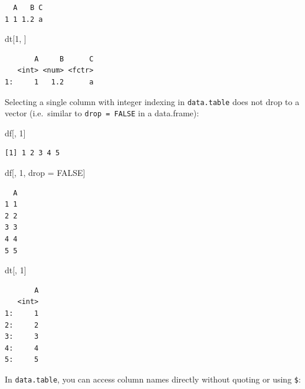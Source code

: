 \documentclass[
]{book}
\newenvironment{Shaded}{\begin{snugshade}}{\end{snugshade}}
\newcommand{\ConstantTok}[1]{\textcolor[rgb]{0.00,0.00,0.00}{#1}}
\newcommand{\DecValTok}[1]{\textcolor[rgb]{0.00,0.00,0.81}{#1}}
\newcommand{\NormalTok}[1]{#1}
\newcommand{\OtherTok}[1]{\textcolor[rgb]{0.56,0.35,0.01}{#1}}
\begin{document}
\begin{verbatim}
  A   B C
1 1 1.2 a
\end{verbatim}

\begin{Shaded}
\begin{Highlighting}[]
\NormalTok{dt[}\DecValTok{1}\NormalTok{, ]}
\end{Highlighting}
\end{Shaded}

\begin{verbatim}
       A     B      C
   <int> <num> <fctr>
1:     1   1.2      a
\end{verbatim}

Selecting a single column with integer indexing in \texttt{data.table} does not drop to a vector (i.e.~similar to \texttt{drop\ =\ FALSE} in a data.frame):

\begin{Shaded}
\begin{Highlighting}[]
\NormalTok{df[, }\DecValTok{1}\NormalTok{]}
\end{Highlighting}
\end{Shaded}

\begin{verbatim}
[1] 1 2 3 4 5
\end{verbatim}

\begin{Shaded}
\begin{Highlighting}[]
\NormalTok{df[, }\DecValTok{1}\NormalTok{, drop }\OtherTok{=} \ConstantTok{FALSE}\NormalTok{]}
\end{Highlighting}
\end{Shaded}

\begin{verbatim}
  A
1 1
2 2
3 3
4 4
5 5
\end{verbatim}

\begin{Shaded}
\begin{Highlighting}[]
\NormalTok{dt[, }\DecValTok{1}\NormalTok{]}
\end{Highlighting}
\end{Shaded}

\begin{verbatim}
       A
   <int>
1:     1
2:     2
3:     3
4:     4
5:     5
\end{verbatim}

In \texttt{data.table}, you can access column names directly without quoting or using \texttt{\$}:
\end{document}
